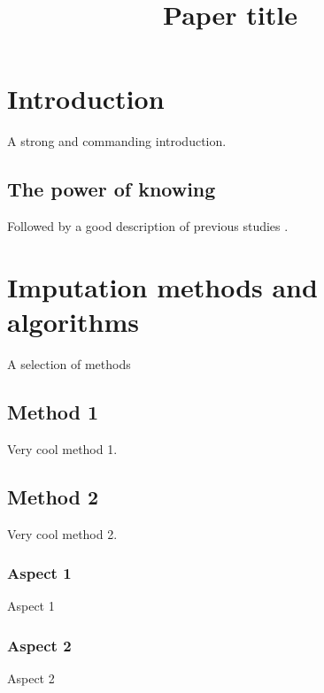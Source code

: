 \documentclass[a4paper,man,floatsintext,natbib]{apa6}\usepackage[]{graphicx}\usepackage[]{xcolor}
\title{Paper title}
\begin{document}
	\maketitle

    \linenumbers

    \setcounter{secnumdepth}{3} %

    
\section{Introduction}

    A strong and commanding introduction.

\subsection{The power of knowing}

    Followed by a good description of previous studies \citep{collinsEtAl:2001}.
    
\section{Imputation methods and algorithms}\label{sec:methods}

	A selection of methods

\subsection{Method 1}

	Very cool method 1.

\subsection{Method 2}

	Very cool method 2.

\subsubsection{Aspect 1}

	Aspect 1

\subsubsection{Aspect 2}

	Aspect 2
    
\end{document}

